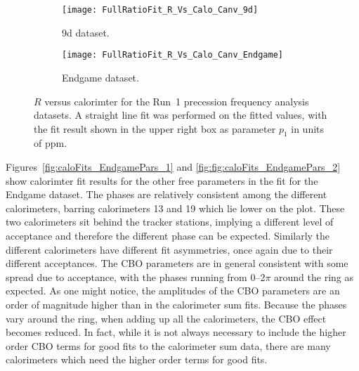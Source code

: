 \begin{landscape}
\begin{figure}[]
\begin{minipage}[t]{0.48\linewidth}
    \begin{subfigure}[]{0.5\linewidth}
        \centering
        \texttt{[image: FullRatioFit\_R\_Vs\_Calo\_Canv\_9d]}
        \caption{9d dataset.}
    \end{subfigure}%
    \begin{subfigure}[]{0.5\linewidth}
        \centering
        \texttt{[image: FullRatioFit\_R\_Vs\_Calo\_Canv\_Endgame]}
        \caption{Endgame dataset.}
    \end{subfigure}
\captionsetup{width=0.9\linewidth}
\caption[$R$ versus calorimeter number]{$R$ versus calorimter for the Run~1 precession frequency analysis datasets. A straight line fit was performed on the fitted values, with the fit result shown in the upper right box as parameter $p_{1}$ in units of ppm.}
\label{fig:caloFits_R}
\end{minipage}
\end{figure}
\end{landscape}





Figures~\ref{fig:caloFits_EndgamePars_1} and \ref{fig:fig:caloFits_EndgamePars_2} show calorimter fit results for the other free parameters in the fit for the Endgame dataset. The \gmtwo phases are relatively consistent among the different calorimeters, barring calorimeters 13 and 19 which lie lower on the plot. These two calorimeters sit behind the tracker stations, implying a different level of acceptance and therefore the different \gmtwo phase can be expected. Similarly the different calorimeters have different fit asymmetries, once again due to their different acceptances. The CBO parameters are in general consistent with some spread due to acceptance, with the phases running from 0--2$\pi$ around the ring as expected. As one might notice, the amplitudes of the CBO parameters are an order of magnitude higher than in the calorimeter sum fits. Because the phases vary around the ring, when adding up all the calorimeters, the CBO effect becomes reduced. In fact, while it is not always necessary to include the higher order CBO terms for good fits to the calorimeter sum data, there are many calorimeters which need the higher order terms for good fits.


